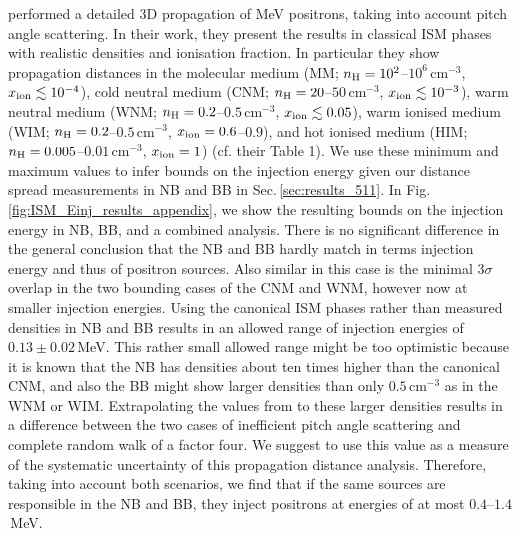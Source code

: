 \documentclass[doublespace,nopageskip]{VTthesis}
\newcommand{\mrm}[1]{\mathrm{#1}}
\begin{document}
\citet{2009A&A...508.1099J} performed a detailed 3D propagation of MeV positrons, taking into account pitch angle scattering.
%
In their work, they present the results in classical ISM phases with realistic densities and ionisation fraction.
%
In particular they show propagation distances in the molecular medium (MM; $n_{\rm H} = 10^2$--$10^6\,\mrm{cm^{-3}}$, $x_{\rm ion} \lesssim 10^{-4}$), cold neutral medium (CNM; $n_{\rm H} = 20$--$50\,\mrm{cm^{-3}}$, $x_{\rm ion} \lesssim 10^{-3}$), warm neutral medium (WNM; $n_{\rm H} = 0.2$--$0.5\,\mrm{cm^{-3}}$, $x_{\rm ion} \lesssim 0.05$), warm ionised medium (WIM; $n_{\rm H} = 0.2$--$0.5\,\mrm{cm^{-3}}$, $x_{\rm ion} = 0.6$--$0.9$), and hot ionised medium (HIM; $n_{\rm H} = 0.005$--$0.01\,\mrm{cm^{-3}}$, $x_{\rm ion} = 1$) (cf. their Table 1).
%
We use these minimum and maximum values to infer bounds on the injection energy given our distance spread measurements in NB and BB in Sec.\,\ref{sec:results_511}.
%
In Fig.\,\ref{fig:ISM_Einj_results_appendix}, we show the resulting bounds on the injection energy in NB, BB, and a combined analysis.
%	
There is no significant difference in the general conclusion that the NB and BB hardly match in terms injection energy and thus of positron sources.
%
Also similar in this case is the minimal $3\sigma$ overlap in the two bounding cases of the CNM and WNM, however now at smaller injection energies.
%
Using the canonical ISM phases rather than measured densities in NB and BB results in an allowed range of injection energies of $0.13 \pm 0.02$\,MeV.
%
This rather small allowed range might be too optimistic because it is known that the NB has densities about ten times higher than the canonical CNM, and also the BB might show larger densities than only $0.5\,\mrm{cm^{-3}}$ as in the WNM or WIM.
%
Extrapolating the values from \citet{2009A&A...508.1099J} to these larger densities results in a difference between the two cases of inefficient pitch angle scattering and complete random walk of a factor four.
%
We suggest to use this value as a measure of the systematic uncertainty of this propagation distance analysis.
%
Therefore, taking into account both scenarios, we find that if the same sources are responsible in the NB and BB, they inject positrons at energies of at most $0.4$--$1.4$\,MeV.
\end{document}
